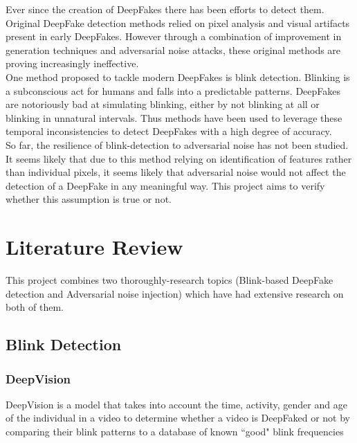 \documentclass{article}
\begin{document}
Ever since the creation of DeepFakes there has been efforts to detect them. Original DeepFake detection methods relied on pixel analysis and visual artifacts present in early DeepFakes\cite{yu2021survey}. However through a combination of improvement in generation techniques and adversarial noise attacks\cite{huang2020fakeretouch}\cite{pertubations}, these original methods are proving increasingly ineffective.\\

One method proposed to tackle modern DeepFakes is blink detection. Blinking is a subconscious act for humans and falls into a predictable patterns. DeepFakes are notoriously bad at simulating blinking, either by not blinking at all or blinking in unnatural intervals. Thus methods have been used to leverage these temporal inconsistencies to detect DeepFakes with a high degree of accuracy\cite{blinking-pattern}.\\

So far, the resilience of blink-detection to adversarial noise has not been studied. It seems likely that due to this method relying on identification of features rather than individual pixels, it seems likely that adversarial noise would not affect the detection of a DeepFake in any meaningful way. This project aims to verify whether this assumption is true or not.

\section{Literature Review} \label{sec:literature-review}

This project combines two thoroughly-research topics (Blink-based DeepFake detection and Adversarial noise injection) which have had extensive research on both of them.

\subsection{Blink Detection}
\subsubsection{DeepVision}

DeepVision\cite{blinking-pattern} is a model that takes into account the time, activity, gender and age of the individual in a video to determine whether a video is DeepFaked or not by comparing their blink patterns to a database of known ``good" blink frequencies\\
\end{document}
